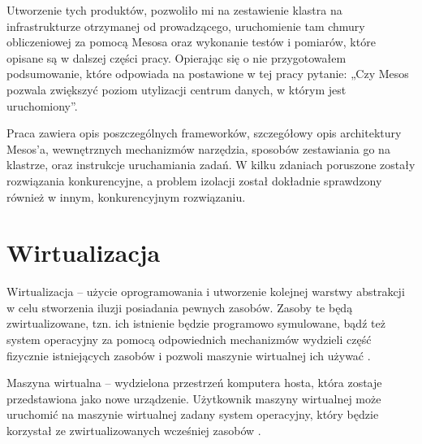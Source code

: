 \documentclass[10pt,a4paper,titlepage,twoside]{report}
\begin{document}
Utworzenie tych produktów, pozwoliło mi na zestawienie klastra na infrastrukturze otrzymanej od prowadzącego, uruchomienie tam chmury obliczeniowej za pomocą Mesosa oraz wykonanie testów i pomiarów, które opisane są w dalszej części pracy. Opierając się o nie przygotowałem podsumowanie, które odpowiada na postawione w tej pracy pytanie: „Czy Mesos pozwala zwiększyć poziom utylizacji centrum danych, w którym jest uruchomiony”.

Praca zawiera opis poszczególnych frameworków, szczegółowy opis architektury Mesos’a, wewnętrznych mechanizmów narzędzia, sposobów zestawiania go na klastrze, oraz instrukcje uruchamiania zadań. W kilku zdaniach poruszone zostały rozwiązania konkurencyjne, a problem izolacji został dokładnie sprawdzony również w innym, konkurencyjnym rozwiązaniu.

\section{Wirtualizacja}
\indent \indent Wirtualizacja – użycie oprogramowania i utworzenie kolejnej warstwy abstrakcji w celu stworzenia iluzji posiadania pewnych zasobów. Zasoby te będą zwirtualizowane, tzn. ich istnienie będzie programowo symulowane, bądź też system operacyjny za pomocą odpowiednich mechanizmów wydzieli część fizycznie istniejących zasobów i pozwoli maszynie wirtualnej ich używać \cite{ad15}.

Maszyna wirtualna – wydzielona przestrzeń komputera hosta, która zostaje przedstawiona jako nowe urządzenie. Użytkownik maszyny wirtualnej może uruchomić na maszynie wirtualnej zadany system operacyjny, który będzie korzystał ze zwirtualizowanych wcześniej zasobów \cite{ad15}.
\end{document}
